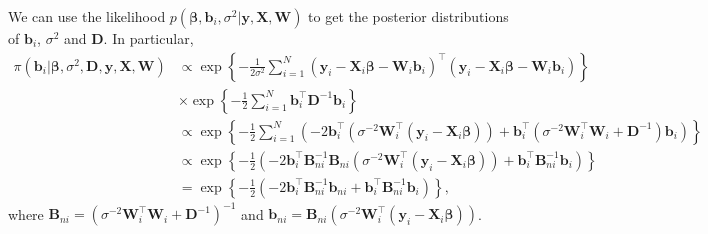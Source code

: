 We can use the likelihood $p(\bm{\beta},\bm{b}_i,\sigma^2|\bm{y}, \bm{X},\bm{W})$ to get the posterior distributions of $\bm{b}_i$, $\sigma^2$ and $\bm{D}$. In particular,
\begin{align*}
	\pi(\bm{b}_i|\bm{\beta},\sigma^2,\bm{D},\bm{y}, \bm{X}, \bm{W})&\propto \exp\left\{-\frac{1}{2\sigma^2}\sum_{i=1}^N(\bm{y}_i-\bm{X}_i\bm{\beta}-\bm{W}_i\bm{b}_i)^{\top}(\bm{y}_i-\bm{X}_i\bm{\beta}-\bm{W}_i\bm{b}_i)\right\}\\
	&\times \exp\left\{-\frac{1}{2}\sum_{i=1}^N \bm{b}_i^{\top}\bm{D}^{-1}\bm{b}_i\right\}\\
	&\propto\exp\left\{-\frac{1}{2}\sum_{i=1}^N(-2\bm{b}_i^{\top}(\sigma^{-2}\bm{W}_i^{\top}(\bm{y}_i-\bm{X}_i\bm{\beta}))+ \bm{b}_i^{\top}(\sigma^{-2}\bm{W}_i^{\top}\bm{W}_i+\bm{D}^{-1})\bm{b}_i)\right\}\\
	&\propto\exp\left\{-\frac{1}{2}(-2\bm{b}_i^{\top}\bm{B}_{ni}^{-1}\bm{B}_{ni}(\sigma^{-2}\bm{W}_i^{\top}(\bm{y}_i-\bm{X}_i\bm{\beta}))+ \bm{b}_i^{\top}\bm{B}_{ni}^{-1}\bm{b}_i)\right\}\\
	&=\exp\left\{-\frac{1}{2}(-2\bm{b}_i^{\top}\bm{B}_{ni}^{-1}\bm{b}_{ni}+ \bm{b}_i^{\top}\bm{B}_{ni}^{-1}\bm{b}_i)\right\}, 
\end{align*}
where $\bm{B}_{ni}=(\sigma^{-2}\bm{W}_i^{\top}\bm{W}_i+\bm{D}^{-1})^{-1}$ and $\bm{b}_{ni}=\bm{B}_{ni}(\sigma^{-2}\bm{W}_i^{\top}(\bm{y}_i-\bm{X}_i\bm{\beta}))$.


